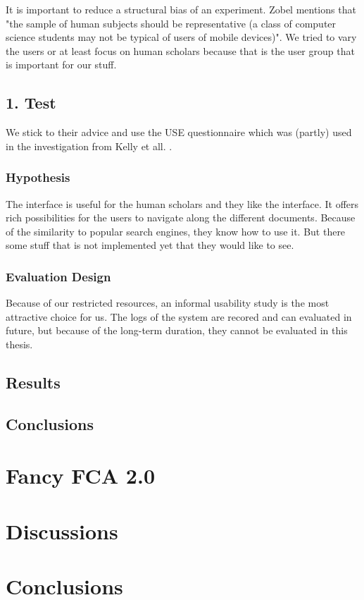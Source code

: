 \documentclass[11pt]{report}
\begin{document}
It is important to reduce a structural bias of an experiment. Zobel \cite{Zobel2004} mentions that "the sample of human subjects should be representative (a class of computer science students may not be typical of users of mobile devices)". We tried to vary the users or at least focus on human scholars because that is the user group that is important for our stuff.


\section{1. Test}

We stick to their advice and use the USE questionnaire \cite{lund2001measuring} which was (partly) used in the investigation from Kelly et all. \cite{Kelly2008}.


\subsection{Hypothesis}

The interface is useful for the human scholars and they like the interface. It offers rich possibilities for the users to navigate along the different documents. Because of the similarity to popular search engines, they know how to use it. But there some stuff that is not implemented yet that they would like to see.

\subsection{Evaluation Design}

Because of our restricted resources, an informal usability study is the most attractive choice for us. The logs of the system are recored and can evaluated in future, but because of the long-term duration, they cannot be evaluated in this thesis.
\section{Results}

\section{Conclusions}

\chapter{Fancy FCA 2.0}

\blindtext

\chapter{Discussions}

\blindtext

\chapter{Conclusions}

\blindtext

\newpage



\end{document}
